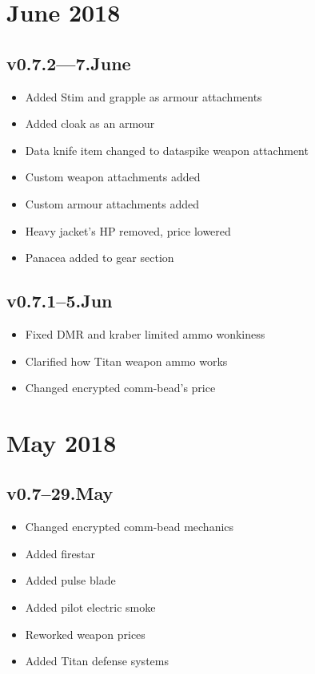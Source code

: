 \documentclass[9pt, openany]{extbook}
\begin{document}
{\small

\section{June 2018}

\subsection{v0.7.2---7.June}
\begin{itemize}[noitemsep]
\item Added Stim and grapple as armour attachments
\item Added cloak as an armour
\item Data knife item changed to dataspike weapon attachment
\item Custom weapon attachments added
\item Custom armour attachments added
\item Heavy jacket's HP removed, price lowered
\item Panacea added to gear section
\end{itemize}


\subsection{v0.7.1--5.Jun}
\begin{itemize}[noitemsep]
\item Fixed DMR and kraber limited ammo wonkiness
\item Clarified how Titan weapon ammo works
\item Changed encrypted comm-bead's price
\end{itemize}

\section{May 2018}

\subsection{v0.7--29.May}
\begin{itemize}[noitemsep]
\item Changed encrypted comm-bead mechanics
\item Added firestar
\item Added pulse blade
\item Added pilot electric smoke
\item Reworked weapon prices
\item Added Titan defense systems
\end{itemize}

}
\end{document}
